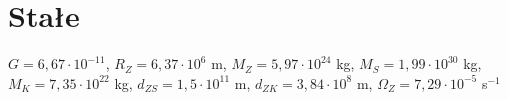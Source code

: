 \documentclass[10pt,a4paper,twocolumn]{article}
\begin{document}
\section{Stałe}
$G = 6{,}67\cdot10^{-11}$, $R_Z = 6{,}37\cdot10^6$ m, $M_Z = 5{,}97\cdot10^{24}$ kg, $M_S = 1{,}99\cdot10^{30}$ kg, $M_K = 7{,}35\cdot10^{22}$ kg, $d_{ZS} = 1{,}5\cdot10^{11}$ m, $d_{ZK} = 3{,}84\cdot10^8$ m, $\Omega_Z = 7{,}29\cdot10^{-5}$ s$^{-1}$
\end{document}
